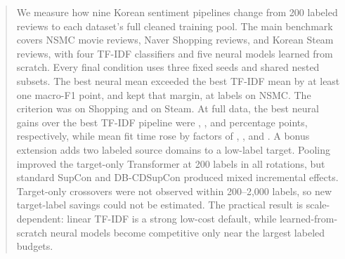\begin{abstract}
We measure how nine Korean sentiment pipelines change from 200 labeled reviews to each dataset's full cleaned training pool. The main benchmark covers NSMC movie reviews, Naver Shopping reviews, and Korean Steam reviews, with four TF-IDF classifiers and five neural models learned from scratch. Every final condition uses three fixed seeds and shared nested subsets. The best neural mean exceeded the best TF-IDF mean by at least one macro-F1 point, and kept that margin, at  labels on NSMC. The criterion was  on Shopping and  on Steam. At full data, the best neural gains over the best TF-IDF pipeline were , , and  percentage points, respectively, while mean fit time rose by factors of , , and . A bonus extension adds two labeled source domains to a low-label target. Pooling improved the target-only Transformer at 200 labels in all rotations, but standard SupCon and DB-CDSupCon produced mixed incremental effects. Target-only crossovers were not observed within 200--2,000 labels, so new target-label savings could not be estimated. The practical result is scale-dependent: linear TF-IDF is a strong low-cost default, while learned-from-scratch neural models become competitive only near the largest labeled budgets.
\end{abstract}
